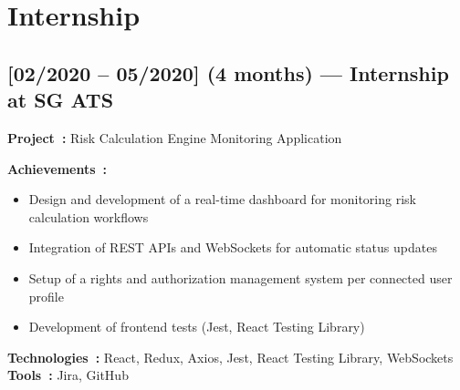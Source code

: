 \newpage
\section*{Internship}

\subsection*{[02/2020 -- 05/2020] (4 months) --- Internship at SG ATS}
\vspace{4pt}
\textbf{Project~:} Risk Calculation Engine Monitoring Application

\textbf{Achievements~:}
\begin{itemize}
    \item Design and development of a real-time dashboard for monitoring risk calculation workflows
    \item Integration of REST APIs and WebSockets for automatic status updates
    \item Setup of a rights and authorization management system per connected user profile
    \item Development of frontend tests (Jest, React Testing Library)
\end{itemize}
\textbf{Technologies~:} React, Redux, Axios, Jest, React Testing Library, WebSockets\\
\textbf{Tools~:} Jira, GitHub
